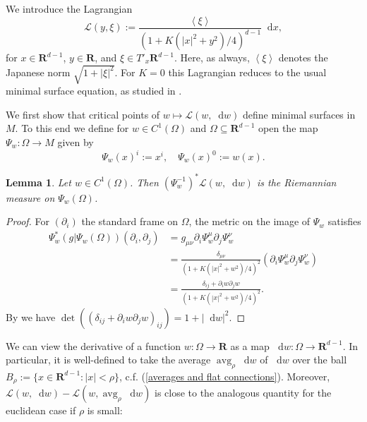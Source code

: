 \documentclass[reqno,11pt]{amsart}
\newcommand{\RR}{\mathbf{R}}
\DeclareMathOperator{\avg}{avg}
\newcommand*\dif{\mathop{}\!\mathrm{d}}
\newcommand{\Lagrange}{\mathscr L}
\def\Japan#1{\left \langle #1 \right \rangle}
\newtheorem{lemma}[theorem]{Lemma}
\theoremstyle{definition}
\numberwithin{equation}{section}
\begin{document}
We introduce the Lagrangian
$$\Lagrange(y, \xi) := \frac{\Japan{\xi}}{(1 + K(|x|^2 + y^2)/4)^{d - 1}} \dif x,$$
for $x \in \RR^{d - 1}$, $y \in \RR$, and $\xi \in T'_x \RR^{d - 1}$.
Here, as always, $\Japan \xi$ denotes the Japanese norm $\sqrt{1 + |\xi|^2}$.
For $K = 0$ this Lagrangian reduces to the usual minimal surface equation, as studied in \cite[\S6]{Giusti77}.

We first show that critical points of $w \mapsto \Lagrange(w, \dif w)$ define minimal surfaces in $M$.
To this end we define for $w \in C^1(\Omega)$ and $\Omega \subseteq \RR^{d - 1}$ open the map $\Psi_w: \Omega \to M$ given by
$$\Psi_w(x)^i := x^i, \quad \Psi_w(x)^0 := w(x).$$

\begin{lemma}\label{Plateau setup lemma}
Let $w \in C^1(\Omega)$. Then $(\Psi_w^{-1})^* \Lagrange(w, \dif w)$ is the Riemannian measure on $\Psi_w(\Omega)$.
\end{lemma}
\begin{proof}
For $(\partial_i)$ the standard frame on $\Omega$, the metric on the image of $\Psi_w$ satisfies
\begin{align*}
\Psi_w^*(g|\Psi_w(\Omega))(\partial_i, \partial_j) &= g_{\mu\nu} \partial_i \Psi_w^\mu \partial_j \Psi_w^\nu \\
&= \frac{\delta_{\mu\nu}}{(1 + K(|x|^2 + w^2)/4)^2} (\partial_i \Psi_w^\mu \partial_j \Psi_w^\nu) \\
&= \frac{\delta_{ij} + \partial_i w \partial_j w}{(1 + K(|x|^2 + w^2)/4)^2}.
\end{align*}
By \cite[(24)]{Petersen2008} we have $\det((\delta_{ij} + \partial_i w \partial_j w)_{ij}) = 1 + |\dif w|^2$.
\end{proof}

We can view the derivative of a function $w: \Omega \to \RR$ as a map $\dif w: \Omega \to \RR^{d - 1}$.
In particular, it is well-defined to take the average $\avg_\rho \dif w$ of $\dif w$ over the ball $B_\rho := \{x \in \RR^{d - 1}: |x| < \rho\}$, c.f. (\ref{averages and flat connections}).
Moreover, $\Lagrange(w, \dif w) - \Lagrange(w, \avg_\rho \dif w)$ is close to the analogous quantity for the euclidean case if $\rho$ is small:
\end{document}
